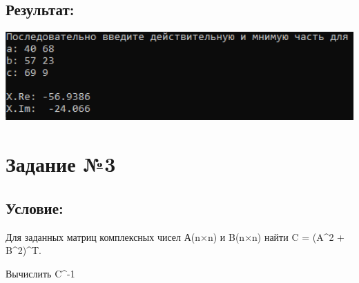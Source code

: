 \documentclass[a4paper]{article}
\begin{document}
\subsection{Результат:}
\includegraphics[width=1\textwidth]{2.png}
\newpage
\section{Задание №3} 
\subsection{Условие:}
Для заданных матриц комплексных чисел А(n×n) и B(n×n) найти C = (A^2 + B^2)^T.

Вычислить C^{-1}
\end{document}
